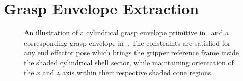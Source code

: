 \section{Grasp Envelope Extraction}
\label{sec:method}
\begin{figure}[t!]
\centering
{}
\caption{An illustration of a cylindrical grasp envelope primitive in~
  and a corresponding grasp envelope in~. The constraints are satisfied
  for any end effector pose which brings the gripper reference frame inside the shaded cylindrical
  shell sector, while maintaining orientation of the $x$ and $z$ axis within their respective shaded
  cone regions.}
\label{fig:grasp_envelope}
\end{figure}
